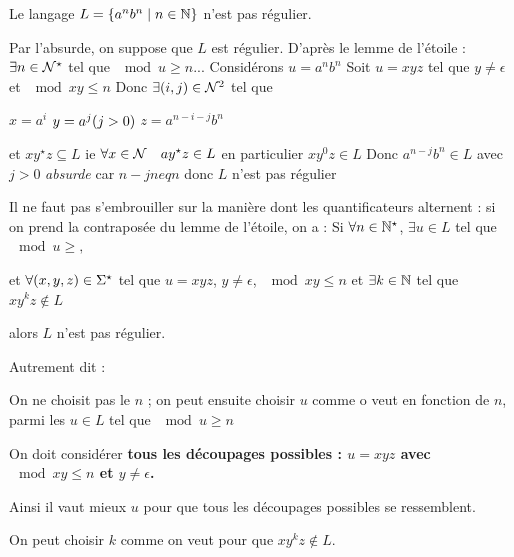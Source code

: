     \begin{theorem}{}{}
        Le langage $L = \left\{a^n b^n \;\middle\vert\; n \in \mathbb{N}\right\}$ n'est pas régulier.
    \end{theorem}
    
    \begin{nproof}
        Par l'absurde, on suppose que $L$ est régulier. D'après le lemme de l'étoile : $\exists n \in \mathcal{N}^\star$ tel que $\mod{u} \geq n$...
        Considérons $u = a^n b^n$
        Soit $u = x y z$ tel que $y \neq \epsilon$ et $\mod{xy} \leq n$
        Donc $\exists  \!\left(i, j\right) \in \mathcal{N}^2$ tel que
        \begin{enumerate}
            \itt $x = a^i$
            \itt $y =a^j \!\left(j > 0\right)$
            \itt $z = a^{n-i-j} b^n$
        \end{enumerate}
        et $x y^\star z \subseteq L$
        ie $\forall x \in \mathcal{N} \quad a y^\star z \in L$ en particulier $x y^0 z \in L$
        Donc $a^{n-j} b^n \in L$
        avec $j>0$ \emph{absurde} car $n-j neq n$
        donc $L$ n'est pas régulier
    \end{nproof}
    
    \begin{warning}{}{}
        Il ne faut pas s'embrouiller sur la manière dont les quantificateurs alternent : si on prend la contraposée du lemme de l'étoile, on a :
        Si $\forall n \in \mathbb{N}^\star$, $\exists u \in L$ tel que $\mod{u} \geq ,$
        
        et $\forall \!\left(x, y, z\right) \in \Sigma^\star$ tel que $u = xyz$, $y \neq \epsilon$, $\mod{xy} \leq n$ et $\exists k \in \mathbb{N}$ tel que $xy^kz \not\in L$
        
        alors $L$ n'est pas régulier.
        
        Autrement dit :
        \begin{enumerate}
            \itt On ne choisit pas le $n$ ;
            \itt on peut ensuite choisir $u$ comme o veut en fonction de $n$, parmi les $u \in L$ tel que $\mod{u} \geq n$
            
            \itt On doit considérer \bf{tous} les découpages possibles :
            $u = xyz$ avec $\mod{xy} \leq n$ et $y \neq \epsilon$.
            
            Ainsi il vaut mieux  $u$ pour que tous les découpages possibles se ressemblent. 
            
            \itt On peut choisir $k$ comme on veut pour que $xy^kz \not\in L$.
        \end{enumerate}
    \end{warning}
    
